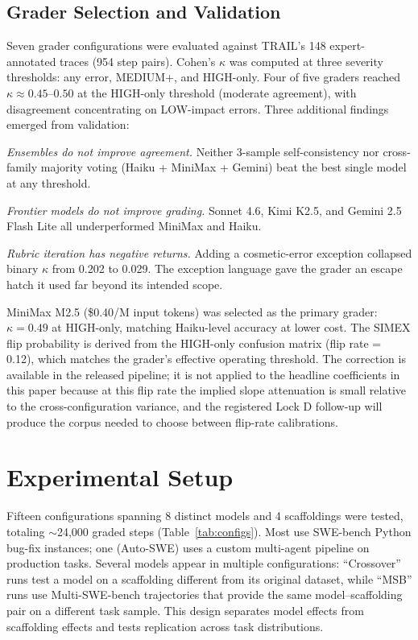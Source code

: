 \documentclass[11pt]{article}
\begin{document}
\subsection{Grader Selection and Validation}
\label{sec:method:validation}

Seven grader configurations were evaluated against TRAIL's 148 expert-annotated traces (954 step pairs).
Cohen's $\kappa$ was computed at three severity thresholds: any error, MEDIUM+, and HIGH-only.
Four of five graders reached $\kappa \approx 0.45$--$0.50$ at the HIGH-only threshold (moderate agreement), with disagreement concentrating on LOW-impact errors.
Three additional findings emerged from validation:

\emph{Ensembles do not improve agreement.}
Neither 3-sample self-consistency nor cross-family majority voting (Haiku + MiniMax + Gemini) beat the best single model at any threshold.

\emph{Frontier models do not improve grading.}
Sonnet 4.6, Kimi K2.5, and Gemini 2.5 Flash Lite all underperformed MiniMax and Haiku.

\emph{Rubric iteration has negative returns.}
Adding a cosmetic-error exception collapsed binary $\kappa$ from 0.202 to 0.029.
The exception language gave the grader an escape hatch it used far beyond its intended scope.

MiniMax M2.5 (\$0.40/M input tokens) was selected as the primary grader: $\kappa = 0.49$ at HIGH-only, matching Haiku-level accuracy at lower cost.
The SIMEX flip probability is derived from the HIGH-only confusion matrix (flip rate = 0.12), which matches the grader's effective operating threshold. The correction is available in the released pipeline; it is not applied to the headline coefficients in this paper because at this flip rate the implied slope attenuation is small relative to the cross-configuration variance, and the registered Lock D follow-up will produce the corpus needed to choose between flip-rate calibrations.

\section{Experimental Setup}

Fifteen configurations spanning 8 distinct models and 4 scaffoldings were tested, totaling ${\sim}$24,000 graded steps (Table~\ref{tab:configs}).
Most use SWE-bench Python bug-fix instances; one (Auto-SWE) uses a custom multi-agent pipeline on production tasks.
Several models appear in multiple configurations: ``Crossover'' runs test a model on a scaffolding different from its original dataset, while ``MSB'' runs use Multi-SWE-bench trajectories that provide the same model--scaffolding pair on a different task sample.
This design separates model effects from scaffolding effects and tests replication across task distributions.
\end{document}
